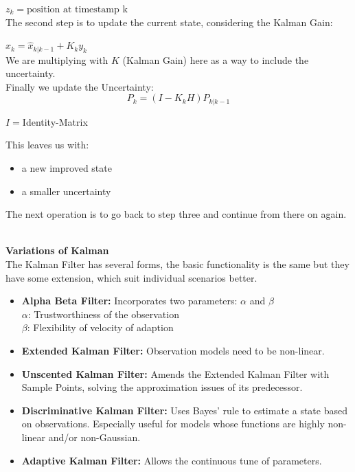 $z_k = \text{position at timestamp k}$\\

The second step is to update the current state, considering the Kalman Gain:

$\hat{x}_k=\hat{x}_{k|k-1} + K_k y_k$\\

We are multiplying with $K$ (Kalman Gain) here as a way to include the uncertainty.\\

Finally we update the Uncertainty:
\[
P_k = (I - K_k H)P_{k|k-1}
\]

$I = $Identity-Matrix

This leaves us with:
\begin{itemize}
    \item a new improved state
    \item a smaller uncertainty
\end{itemize}

The next operation is to go back to step three and continue from there on again.

\noindent\cite{LRWeb:07, LRWeb:09, LRWeb:10} \\

{\large \textbf{Variations of Kalman}}\\[0.5em]
The Kalman Filter has several forms, the basic functionality is the same but they have some extension, which suit individual scenarios better.

\begin{itemize}
    \item \textbf{Alpha Beta Filter:} Incorporates two parameters: $\alpha$ and $\beta$\\
        $\alpha$: Trustworthiness of the observation\\
        $\beta$: Flexibility of velocity of adaption
    \item \textbf{Extended Kalman Filter:} Observation models need to be non-linear.
    \item \textbf{Unscented Kalman Filter:} Amends the Extended Kalman Filter with Sample Points, solving the approximation issues of its predecessor.
    \item \textbf{Discriminative Kalman Filter:} Uses Bayes' rule to estimate a state based on observations. Especially useful for models whose functions are highly non-linear and/or non-Gaussian.
    \item \textbf{Adaptive Kalman Filter:} Allows the continuous tune of parameters.
\end{itemize}
\noindent\cite{LRWeb:06, LRWeb:03, LRWeb:08}\\

